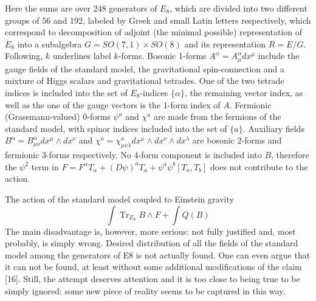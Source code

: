 \documentclass{article}
\DeclareMathOperator{\Tr}{Tr}
\begin{document}
Here the sums are over 248 generators of $E_8$, which are divided into two different groups of 56 and 192, labeled by Greek and small Latin letters respectively, which correspond to decomposition of adjoint (the minimal possible) representation of $E_8$ into a subalgebra $G = SO(7,1) \times SO(8)$ and its representation $R = E/G$. Following, $k$ underlines label $k$-forms. Bosonic 1-forms $A^\alpha = A^\alpha_\mu dx^\mu$ include the gauge fields of the standard model, the gravitational spin-connection and a mixture of Higgs scalars and gravitational tetrades. One of the two tetrade indices is included into the set of $E_8$-indices $\{\alpha\}$, the remaining vector index, as well as the one of the gauge vectors is the 1-form index of $A$. Fermionic (Grassmann-valued) 0-forms $\psi^a$ and $\chi^a$ are made from the fermions of the standard model, with spinor indices included into the set of $\{a\}$. Auxiliary fields $B^\alpha = B^\alpha_{\mu\nu} dx^\mu \wedge dx^\nu$ and $\chi^a = \chi^a_{\mu\nu\lambda} dx^\mu \wedge dx^\nu \wedge dx^\lambda$ are bosonic 2-forms and fermionic 3-forms respectively. No 4-form component is included into $B$, therefore the $\psi^2$ term in $F = F^\alpha T_\alpha + (D\psi)^a T_a + \psi^a \psi^b [T_a, T_b]$ does not contribute to the action.

The action of the standard model coupled to Einstein gravity \\
\begin{equation}
    \int \Tr_{E_8} B \land F + \int Q(B)
\end{equation}
The main disadvantage is, however, more serious:  not fully justified and, most probably, is simply wrong. Desired distribution of all the fields of the standard model among the generators of E8 is not actually found. One can even argue that it can not be found, at least without some additional modifications of the claim [16]. Still, the attempt deserves attention and it is too close to being true to be simply ignored: some new piece of reality seems to be captured in this way. \\
\end{document}
